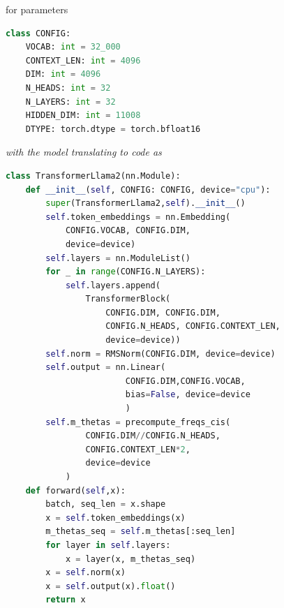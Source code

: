 \documentclass[12pt]{article}
\begin{document}
\begin{figure}[!htb]
\begin{minipage}[t]{0.98\textwidth}
\begin{minipage}{0.3\textwidth}
    for parameters
\begin{lstlisting}[language=python,style=python,basicstyle=\ttfamily\scriptsize]
class CONFIG:
    VOCAB: int = 32_000
    CONTEXT_LEN: int = 4096 
    DIM: int = 4096  
    N_HEADS: int = 32
    N_LAYERS: int = 32
    HIDDEN_DIM: int = 11008
    DTYPE: torch.dtype = torch.bfloat16 
\end{lstlisting}
\end{minipage}
\hspace{10pt}
\begin{minipage}{0.65\textwidth}
\vspace{1em}
{\it with the model translating to code as}
\begin{lstlisting}[language=python,style=python,basicstyle=\ttfamily\footnotesize]
class TransformerLlama2(nn.Module):
    def __init__(self, CONFIG: CONFIG, device="cpu"):
        super(TransformerLlama2,self).__init__()
        self.token_embeddings = nn.Embedding(
            CONFIG.VOCAB, CONFIG.DIM,
            device=device)
        self.layers = nn.ModuleList()
        for _ in range(CONFIG.N_LAYERS):
            self.layers.append(
                TransformerBlock(
                    CONFIG.DIM, CONFIG.DIM, 
                    CONFIG.N_HEADS, CONFIG.CONTEXT_LEN, 
                    device=device))
        self.norm = RMSNorm(CONFIG.DIM, device=device)
        self.output = nn.Linear(
                        CONFIG.DIM,CONFIG.VOCAB,
                        bias=False, device=device
                        )
        self.m_thetas = precompute_freqs_cis(
                CONFIG.DIM//CONFIG.N_HEADS,
                CONFIG.CONTEXT_LEN*2,
                device=device
            )
    def forward(self,x):
        batch, seq_len = x.shape
        x = self.token_embeddings(x)
        m_thetas_seq = self.m_thetas[:seq_len]
        for layer in self.layers:
            x = layer(x, m_thetas_seq)
        x = self.norm(x)
        x = self.output(x).float()
        return x 

\end{lstlisting}
\end{minipage}
\end{minipage}
\end{figure}
\end{document}
